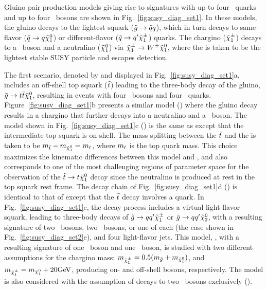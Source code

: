 Gluino pair production models giving rise to signatures with up to four \cPqb\
quarks and up to four \PW\ bosons are shown in Fig.~\ref{fig:susy_diag_set1}. In
these models, the gluino decays to the lightest squark ($\tilde{g} \to \tilde{q}
q$), which in turn decays to same-flavor ($\tilde{q} \to q \tilde{\chi}_1^0$) or
different-flavor ($\tilde{q} \to q' \tilde{\chi}_1^{\pm}$) quarks. The chargino
($\tilde{\chi}_1^{\pm}$) decays to a \PW\ boson and a neutralino ($\tilde{\chi}_1^0$) via $\tilde{\chi}_1^{\pm}
\to W^{\pm} \tilde{\chi}_1^0$, where the \lsp is taken to be the lightest stable SUSY
particle and escapes detection.

The first scenario, denoted by \Totttt and displayed in
Fig.~\ref{fig:susy_diag_set1}a, includes an off-shell top squark ($\tilde{t}$)
leading to the three-body decay of the gluino, $\tilde{g} \to t\bar{t}\tilde{\chi}_1^0$,
resulting in events with four \PW\ bosons and four \cPqb\ quarks.
Figure~\ref{fig:susy_diag_set1}b presents a similar model (\TfttbbWW) where the
gluino decay results in a chargino that further decays into a neutralino and
a \PW\ boson. The model shown in Fig.~\ref{fig:susy_diag_set1}c (\Tftttt) is the
same as \Totttt except that the intermediate top squark is on-shell. The mass
splitting between the $\tilde{t}$ and the \lsp is taken to be $m_{\tilde{t}} -
m_{\tilde{\chi}_1^0} = m_{t}$, where $m_{t}$ is the top quark mass. This choice
maximizes the kinematic differences between this model and \Totttt, and also
corresponds to one of the most challenging regions of parameter space for the
observation of the $\tilde{t} \to t \tilde{\chi}_1^0$ decay since the neutralino is
produced at rest in the top squark rest frame. The decay chain of
Fig.~\ref{fig:susy_diag_set1}d (\Tfttcc) is identical to that of \Tftttt except
that the $\tilde{t}$ decay involves a \PQc quark. In
Fig.~\ref{fig:susy_diag_set1}e, the decay process includes a virtual light-flavor
squark, leading to three-body decays of $\tilde{g} \to q q' \tilde{\chi}_1^{\pm}$ or
$\tilde{g} \to q q' \tilde{\chi}_2^0$, with a resulting signature of two
\PW\ bosons, two \PZ\ bosons, or one of each (the case shown in
Fig.~\ref{fig:susy_diag_set2}e), and four light-flavor jets. This model,
\TfqqqqWZ, with a resulting signature of one \PW\ boson and one \PZ\ boson,
is studied with two different assumptions for the chargino mass:
$m_{\tilde{\chi}_1^{\pm}} = 0.5(m_{\tilde{g}} + m_{\tilde{\chi}_1^0})$, and $m_{\tilde{\chi}_1^{\pm}} =
m_{\tilde{\chi}_1^0}+20 \text{GeV}$, producing on- and off-shell bosons, respectively. The
model is also considered with the assumption of decays to two \PW\ bosons
exclusively (\TfqqqqWW).

